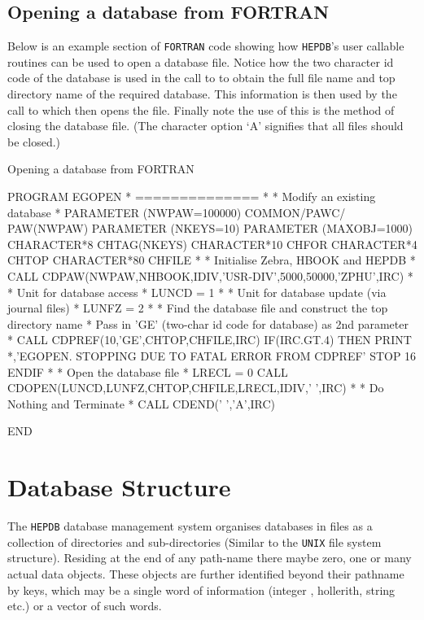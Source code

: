 \subsection {Opening a database from FORTRAN}
Below is an example section of {\tt FORTRAN} code showing how {\tt HEPDB}'s
user callable routines can be used to open a database file. Notice how the
two character id code of the database is used in the call to 
to obtain the full file name and top directory name of the required database.
This information is then used by the call to  which then opens
the file. Finally note the use of  this is the method of closing
the database file. (The character option `A' signifies that all files should be closed.)
%
\begin{XMPt}{Opening a database from FORTRAN}

      PROGRAM EGOPEN
*     ==============
*
*     Modify an existing database
*
      PARAMETER    (NWPAW=100000)
      COMMON/PAWC/ PAW(NWPAW)
      PARAMETER    (NKEYS=10)
      PARAMETER    (MAXOBJ=1000)
      CHARACTER*8  CHTAG(NKEYS)
      CHARACTER*10 CHFOR
      CHARACTER*4  CHTOP
      CHARACTER*80 CHFILE
*
*     Initialise Zebra, HBOOK and HEPDB
*
      CALL CDPAW(NWPAW,NHBOOK,IDIV,'USR-DIV',5000,50000,'ZPHU',IRC)
*
*     Unit for database access
*
      LUNCD  = 1
*
*     Unit for database update (via journal files)
*
      LUNFZ  = 2
*
*     Find the database file and construct the top directory name
*     Pass in 'GE' (two-char id code for database) as 2nd parameter
*
      CALL CDPREF(10,'GE',CHTOP,CHFILE,IRC)
      IF(IRC.GT.4) THEN
         PRINT *,'EGOPEN. STOPPING DUE TO FATAL ERROR FROM CDPREF'
         STOP 16
      ENDIF
*
*     Open the database file
*
      LRECL  = 0
      CALL CDOPEN(LUNCD,LUNFZ,CHTOP,CHFILE,LRECL,IDIV,' ',IRC)
*
*     Do Nothing and Terminate
*
      CALL CDEND(' ','A',IRC)

      END

\end{XMPt}
%
%
%
\section{Database Structure}
The {\tt HEPDB} database management system organises databases in files
as a collection of directories and sub-directories (Similar to the
{\tt UNIX} file system structure). Residing at the end of any path-name
there maybe zero, one or many actual data objects. These objects are further identified
beyond their pathname by keys, which may be a single word of information
(integer , hollerith, string etc.) or a vector of such words.
%
%
%
